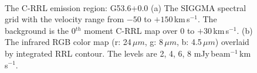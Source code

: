 \documentclass[manuscript]{aastex61}
\newcommand{\kms}{\,km\,s$^{-1}$}
\newcommand{\um}{\mu m}
\begin{document}
\begin{figure}[H]
	\centering
	\\
	\caption{The C-RRL emission region: G53.6+0.0
	(a) The SIGGMA spectral grid with the velocity range from $-50$ to $+150$\kms.
	The background is the 0$^{th}$ moment C-RRL map over $0$ to $+30$\kms.
	(b) The infrared RGB color map (r: 24\,$\um$, g: 8\,$\um$, b: 4.5\,$\um$) overlaid by integrated RRL contour.
	The levels are 2, 4, 6, 8 mJy\,beam$^{-1}$\kms.}
	\label{fig_crrl-g536}
\end{figure}
\end{document}
